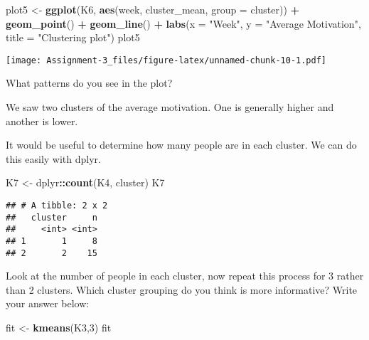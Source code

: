 \documentclass[]{article}
\newenvironment{Shaded}{\begin{snugshade}}{\end{snugshade}}
\newcommand{\DataTypeTok}[1]{\textcolor[rgb]{0.13,0.29,0.53}{#1}}
\newcommand{\DecValTok}[1]{\textcolor[rgb]{0.00,0.00,0.81}{#1}}
\newcommand{\KeywordTok}[1]{\textcolor[rgb]{0.13,0.29,0.53}{\textbf{#1}}}
\newcommand{\NormalTok}[1]{#1}
\newcommand{\OperatorTok}[1]{\textcolor[rgb]{0.81,0.36,0.00}{\textbf{#1}}}
\newcommand{\StringTok}[1]{\textcolor[rgb]{0.31,0.60,0.02}{#1}}
\begin{document}
\begin{Shaded}
\begin{Highlighting}[]
\NormalTok{plot5 <-}\StringTok{ }\KeywordTok{ggplot}\NormalTok{(K6, }\KeywordTok{aes}\NormalTok{(week, cluster_mean, }\DataTypeTok{group =}\NormalTok{ cluster)) }\OperatorTok{+}
\StringTok{         }\KeywordTok{geom_point}\NormalTok{() }\OperatorTok{+}
\StringTok{         }\KeywordTok{geom_line}\NormalTok{() }\OperatorTok{+}
\StringTok{         }\KeywordTok{labs}\NormalTok{(}\DataTypeTok{x =} \StringTok{"Week"}\NormalTok{, }\DataTypeTok{y =} \StringTok{"Average Motivation"}\NormalTok{, }
              \DataTypeTok{title =} \StringTok{"Clustering plot"}\NormalTok{)}
\NormalTok{plot5}
\end{Highlighting}
\end{Shaded}

\texttt{[image: Assignment-3\_files/figure-latex/unnamed-chunk-10-1.pdf]}

What patterns do you see in the plot?

We saw two clusters of the average motivation. One is generally higher
and another is lower.

It would be useful to determine how many people are in each cluster. We
can do this easily with dplyr.

\begin{Shaded}
\begin{Highlighting}[]
\NormalTok{K7 <-}\StringTok{ }\NormalTok{dplyr}\OperatorTok{::}\KeywordTok{count}\NormalTok{(K4, cluster)}
\NormalTok{K7}
\end{Highlighting}
\end{Shaded}

\begin{verbatim}
## # A tibble: 2 x 2
##   cluster     n
##     <int> <int>
## 1       1     8
## 2       2    15
\end{verbatim}

Look at the number of people in each cluster, now repeat this process
for 3 rather than 2 clusters. Which cluster grouping do you think is
more informative? Write your answer below:

\begin{Shaded}
\begin{Highlighting}[]
\NormalTok{fit <-}\StringTok{ }\KeywordTok{kmeans}\NormalTok{(K3,}\DecValTok{3}\NormalTok{)}
\NormalTok{fit}
\end{Highlighting}
\end{Shaded}
\end{document}
